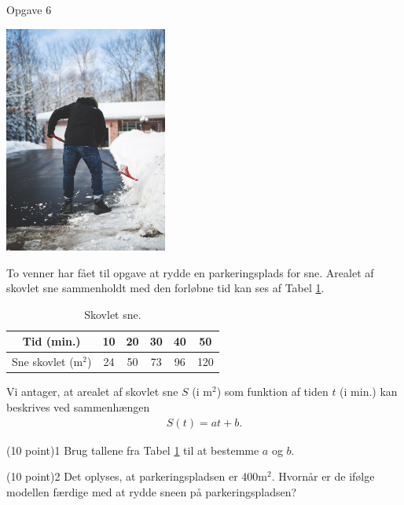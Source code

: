 \begin{opgavetekst}{Opgave 6}
	\begin{center}
	\includegraphics[width= 0.4\textwidth]{Billeder/sne.jpg}
	\end{center}
	To venner har fået til opgave at rydde en parkeringsplads for sne.
	Arealet af skovlet sne sammenholdt med den forløbne tid kan ses af Tabel
	\ref{tab:sne}.
	
	\begin{table}[H]
		\centering
		\begin{tabular}{c|c|c|c|c|c}
		Tid (min.) & 10 & 20 & 30 & 40 & 50 \\
		\hline
		Sne skovlet (m$^2$) & 24 & 50 & 73 & 96 & 120 
		\end{tabular}
		\caption{Skovlet sne.}
		\label{tab:sne}
	\end{table}
	Vi antager, at arealet af skovlet sne $S$ (i m$^2$) som funktion af tiden $t$ (i min.) kan beskrives ved sammenhængen
	\begin{align*}
		S(t) = at+b.
	\end{align*}
\end{opgavetekst}
\begin{delopgave}{(10 point)}{1}
	Brug tallene fra Tabel \ref{tab:sne} til at bestemme $a$ og $b$. 
\end{delopgave}

\begin{delopgave}{(10 point)}{2}
	Det oplyses, at parkeringspladsen er 400m$^2$. Hvornår er de ifølge modellen færdige med at rydde sneen på parkeringspladsen?
\end{delopgave}